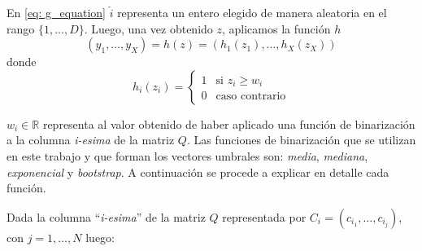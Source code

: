 	En \ref{eq: g_equation} $\hat{i}$ representa un entero elegido de manera aleatoria en el rango $\{1,\dots,D\}$. Luego, una vez obtenido $z$, aplicamos la función $h$
	\begin{equation}
	\label{eq: h_equation}
		(y_1,\dots,y_X) = h(z) = (h_1(z_1),\dots,h_X(z_X))
	\end{equation}
	donde
	\[
    		h_{i}(z_i) = 
		\begin{cases}
    			1 & \text{si } z_i \geq w_{i}\\
    			0 & \text{caso contrario}
		\end{cases}
	\]

	$w_{i} \in \mathbb{R}$ representa al valor obtenido de haber aplicado una función de binarización a la columna \textit{i-esima} de la matriz  $Q$. Las funciones de binarización que se utilizan en este trabajo y que forman los vectores umbrales son: \textit{media}, \textit{mediana}, \textit{exponencial} y \textit{bootstrap}. A continuación se procede a explicar en detalle cada función.
	
	Dada la columna ``\textit{i-esima}'' de la matriz $Q$ representada por $C_i = (c_{i_1}, \dots, c_{i_j})$, con $j=1, \dots, N$ luego:

